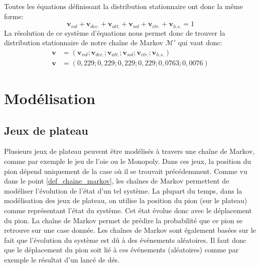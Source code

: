 \documentclass[letterpaper]{article}
\begin{document}
      Toutes les équations définissant la distribution stationnaire ont donc  la même forme:
      $$\mathbf{v}_{vol} + \mathbf{v}_{dec.} + \mathbf{v}_{att.} + \mathbf{v}_{sol} +
	\mathbf{v}_{ctr.} + \mathbf{v}_{h.s.} = 1$$
      La résolution de ce système d'équations nous permet donc de trouver la distribution
      stationnaire de notre chaîne de Markov $\mathcal{M}'$ qui vaut donc:
      \begin{align*}
       \mathbf{v} &= (\mathbf{v}_{vol}; \mathbf{v}_{dec.}; \mathbf{v}_{att.}; \mathbf{v}_{sol};
	  \mathbf{v}_{ctr.}; \mathbf{v}_{h.s.})\\
      \mathbf{v} &= (0,229; 0,229; 0,229; 0,229; 0,0763; 0,0076)
      \end{align*}


\section{Modélisation}

  \subsection{Jeux de plateau}
    Plusieurs jeux de plateau peuvent être modélisés à travers une chaîne de Markov,
    comme par exemple le jeu de l'oie ou le Monopoly.  Dans ces jeux,
    la position du pion dépend uniquement de la case où il se trouvait précédemment.
    Comme vu dans le point \ref{def_chaine_markov}, les chaînes de Markov permettent
    de modéliser l'évolution de l'état d'un tel système.  La plupart du temps, dans
    la modélisation des jeux de plateau, on utilise la position du pion (sur le plateau)
    comme représentant l'état du système.  Cet état évolue donc avec le déplacement du
    pion.  La chaîne de Markov permet de prédire la probabilité que ce pion se retrouve
    sur une case donnée.  Les chaînes de Markov sont également basées sur le fait que
    l'évolution du système est dû à des événements aléatoires.  Il faut donc que le
    déplacement du pion soit lié à ces événements (aléatoires) comme par exemple le
    résultat d'un lancé de dés.
\end{document}
